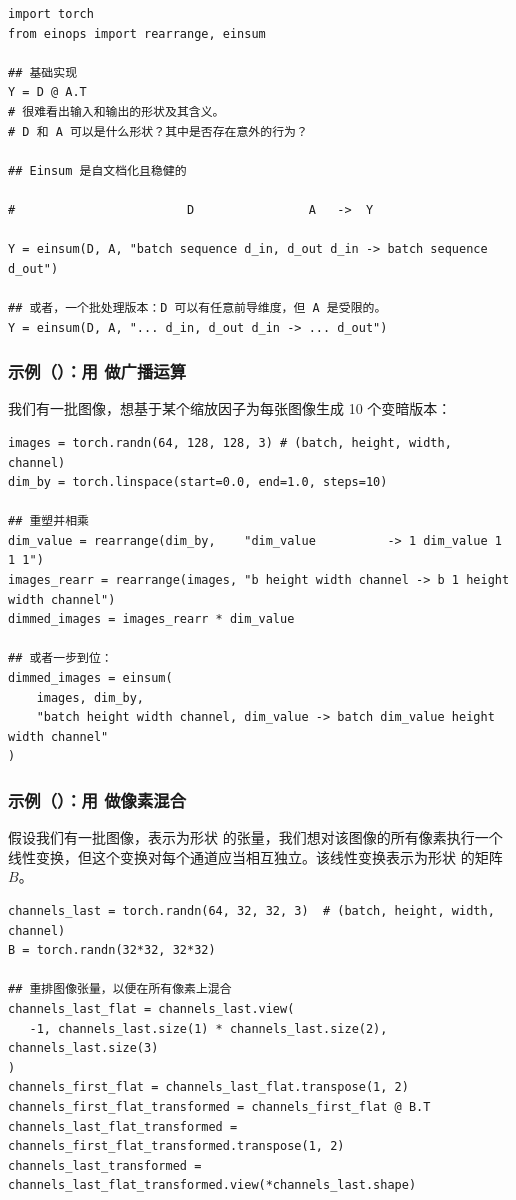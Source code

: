 \begin{lstlisting}
import torch
from einops import rearrange, einsum

## 基础实现
Y = D @ A.T
# 很难看出输入和输出的形状及其含义。
# D 和 A 可以是什么形状？其中是否存在意外的行为？

## Einsum 是自文档化且稳健的

#                        D                A   ->  Y

Y = einsum(D, A, "batch sequence d_in, d_out d_in -> batch sequence d_out")

## 或者，一个批处理版本：D 可以有任意前导维度，但 A 是受限的。
Y = einsum(D, A, "... d_in, d_out d_in -> ... d_out")
\end{lstlisting}

\subsubsection*{示例（）：用  做广播运算}

我们有一批图像，想基于某个缩放因子为每张图像生成 10 个变暗版本：

\begin{lstlisting}
images = torch.randn(64, 128, 128, 3) # (batch, height, width, channel)
dim_by = torch.linspace(start=0.0, end=1.0, steps=10)

## 重塑并相乘
dim_value = rearrange(dim_by,    "dim_value          -> 1 dim_value 1 1 1")
images_rearr = rearrange(images, "b height width channel -> b 1 height width channel")
dimmed_images = images_rearr * dim_value

## 或者一步到位：
dimmed_images = einsum(
    images, dim_by,
    "batch height width channel, dim_value -> batch dim_value height width channel"
)
\end{lstlisting}

\subsubsection*{示例（）：用  做像素混合}

假设我们有一批图像，表示为形状  的张量，我们想对该图像的所有像素执行一个线性变换，但这个变换对每个通道应当相互独立。该线性变换表示为形状  的矩阵 $B$。

\begin{lstlisting}
channels_last = torch.randn(64, 32, 32, 3)  # (batch, height, width, channel)
B = torch.randn(32*32, 32*32)

## 重排图像张量，以便在所有像素上混合
channels_last_flat = channels_last.view(
   -1, channels_last.size(1) * channels_last.size(2), channels_last.size(3)
)
channels_first_flat = channels_last_flat.transpose(1, 2)
channels_first_flat_transformed = channels_first_flat @ B.T
channels_last_flat_transformed = channels_first_flat_transformed.transpose(1, 2)
channels_last_transformed = channels_last_flat_transformed.view(*channels_last.shape)
\end{lstlisting}


